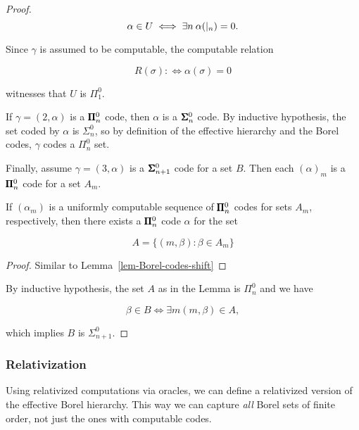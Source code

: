 \begin{proof}
\begin{equation}
\alpha \in U \iff \exists n \: \alpha(\mid_{n})= 0.
\end{equation}

Since $\gamma$ is assumed to be computable, the computable relation

\begin{equation}
R(\sigma) :\iff \alpha(\sigma) = 0
\end{equation}

witnesses that $U$ is $\Pi^0_1$.

If $\gamma = (2, \alpha)$ is a $\pmb{\Pi}^0_n$ code, then $\alpha$ is a $\pmb{\Sigma}^0_n$ code. By inductive hypothesis, the set coded by $\alpha$ is $\Sigma^0_n$, so by definition of the effective hierarchy and the Borel codes, $\gamma$ codes a $\Pi^0_n$ set.

Finally, assume $\gamma = (3,\alpha)$ is a $\pmb{\Sigma}^0_{n+1}$ code for a set $B$. Then each $(\alpha)_m$ is a $\pmb{\Pi}^0_n$ code for a set $A_m$.

\begin{lemma}\label{lem-borel-codes-inverse-shift}If $(\alpha_m)$ is a uniformly computable sequence of $\pmb{\Pi}^0_n$ codes for sets $A_m$, respectively, then there exists a $\pmb{\Pi}^0_n$ code $\alpha$ for the set

\begin{equation}
A = \{(m,\beta) \colon \beta \in A_m\}
\end{equation}

\end{lemma}\begin{proof}Similar to Lemma~\ref{lem-Borel-codes-shift}

\end{proof}By inductive hypothesis, the set $A$ as in the Lemma is $\Pi^0_n$ and we have

\begin{equation}
\beta \in B \iff \exists m (m, \beta )\in A,
\end{equation}

which implies $B$ is $\Sigma^0_{n+1}$.

\end{proof}\subsubsection{Relativization}

Using relativized computations via oracles, we can define a relativized version of the effective Borel hierarchy. This way we can capture \textit{all} Borel sets of finite order, not just the ones with computable codes.

